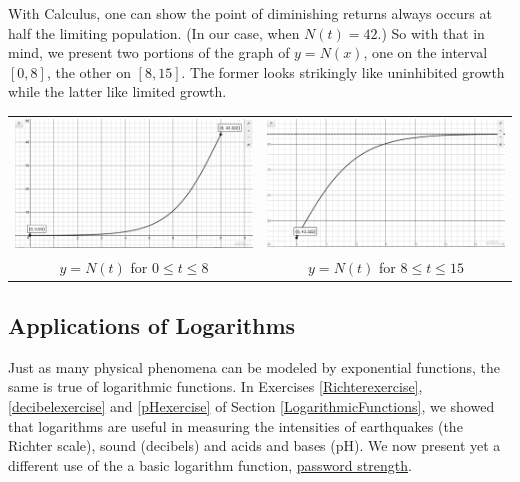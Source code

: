 \smallskip

With Calculus, one can show the point of diminishing returns always occurs at half the limiting population.  (In our case, when $N(t)=42$.)  So with that in mind, we present two portions of the graph of $y=N(x)$, one on the interval $[0,8]$, the other on $[8,15]$. The former looks strikingly like uninhibited growth while the latter like limited growth.

\begin{center}

\begin{tabular}{cc}

\includegraphics[width=3in]{./ApplicationsofExponentialandLogarithmicFunctionsGraphics/ExpLogAppEx02.jpg} &

\includegraphics[width=3in]{./ApplicationsofExponentialandLogarithmicFunctionsGraphics/ExpLogAppEx03.jpg} \\

$y = N(t)$ for $0 \leq t \leq 8$ &

$y = N(t)$ for $8 \leq t \leq 15$

\end{tabular}

\end{center}


\subsection{Applications of Logarithms}

Just as many physical phenomena can be modeled by exponential functions, the same is true of logarithmic functions.   In Exercises \ref{Richterexercise},  \ref{decibelexercise} and \ref{pHexercise} of Section \ref{LogarithmicFunctions}, we showed that logarithms are useful in measuring the intensities of earthquakes (the Richter scale), sound (decibels) and acids and bases (pH).  We now present yet a different use of the a basic logarithm function, \href{http://en.wikipedia.org/wiki/Password_strength}{\underline{password strength}}.

